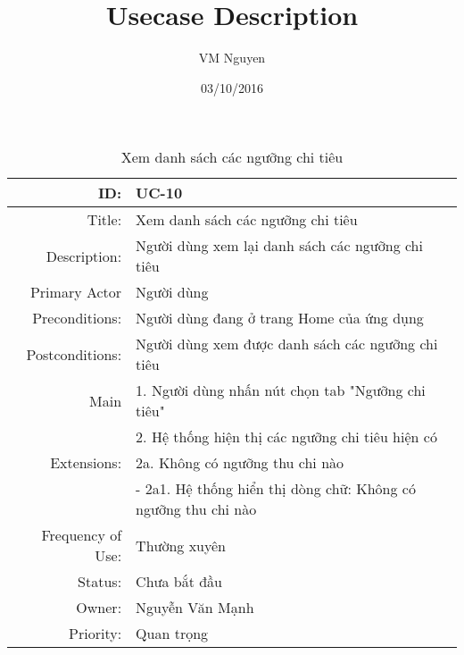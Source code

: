 \documentclass[a4paper,10pt]{article}
\title{Usecase Description}
\author{VM Nguyen}
\date{03/10/2016}
\begin{document}
\maketitle
\newpage
\begin{table}[ht]
 \centering
 \caption{Xem danh sách các ngưỡng chi tiêu} 
 \begin{tabular}{| r | l |}

  \hline 
  ID:  & UC-10 \\ \hline  
  Title:  & Xem danh sách các ngưỡng chi tiêu  \\ \hline
  Description: & Người dùng xem lại danh sách các ngưỡng chi tiêu  \\ \hline
  Primary Actor & Người dùng  \\ \hline
  Preconditions:  & Người dùng đang ở trang Home của ứng dụng \\ \hline
  Postconditions: & Người dùng xem được danh sách các ngưỡng chi tiêu \\ \hline
  Main & {1}. Người dùng nhấn nút chọn tab "Ngưỡng chi tiêu"  \\ 
       & {2}. Hệ thống hiện thị các ngưỡng chi tiêu hiện có \\ \hline
  Extensions: & {2a}. Không có ngưỡng thu chi nào  \\ 
              & \hspace{3mm} - {2a1}. Hệ thống hiển thị dòng chữ: Không có ngưỡng thu chi nào  \\ \hline
  Frequency of Use: & Thường xuyên  \\ \hline
  Status: & Chưa bắt đầu  \\ \hline
  Owner: & Nguyễn Văn Mạnh  \\ \hline
  Priority: & Quan trọng \\
  \hline 
 \end{tabular}

\end{table}
\end{document}
